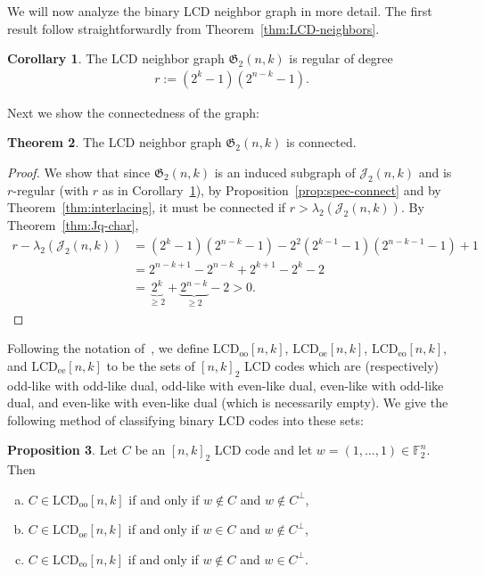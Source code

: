 \documentclass[11pt]{article}
\theoremstyle{definition}
\newtheorem{theorem}{Theorem}[section]
\newtheorem{corollary}[theorem]{Corollary}
\newtheorem{proposition}[theorem]{Proposition}
\newcommand{\F}{\mathbb{F}}
\newcommand{\LCDoo}[2]{\mathrm{LCD}_{\mathrm{oo}} [#1, #2]}
\newcommand{\LCDoe}[2]{\mathrm{LCD}_{\mathrm{oe}} [#1, #2]}
\newcommand{\LCDeo}[2]{\mathrm{LCD}_{\mathrm{eo}} [#1, #2]}
\newcommand{\LCDee}[2]{\mathrm{LCD}_{\mathrm{ee}} [#1, #2]}
\newcommand{\CurJ}{\mathcal{J}}
\newcommand{\Jq}{\CurJ}
\newcommand{\Gq}{\mathfrak{G}}
\begin{document}
We will now analyze the binary LCD neighbor graph in more detail. The first result follow straightforwardly from Theorem~\ref{thm:LCD-neighbors}.

\begin{corollary}\label{cor:regular_binary}
	The LCD neighbor graph $\Gq_2(n, k)$ is regular of degree 
	\begin{align*}
		r := (2^k-1)(2^{n-k}-1).
	\end{align*}
\end{corollary}

Next we show the connectedness of the graph:

\begin{theorem}
	The LCD neighbor graph $\Gq_2(n, k)$ is connected.
\end{theorem}

\begin{proof}
	We show that since $\Gq_2(n, k)$ is an induced subgraph of $\Jq_2(n, k)$ and is $r$-regular (with $r$ as in Corollary~\ref{cor:regular_binary}), by Proposition~\ref{prop:spec-connect} and by Theorem~\ref{thm:interlacing}, it must be connected if $r > \lambda_2(\Jq_2(n, k))$.
	By Theorem~\ref{thm:Jq-char}, 
	\begin{align*}
		r -  \lambda_2(\Jq_2(n, k))
		&= (2^k - 1)(2^{n - k } - 1) - 2^2 (2^{k - 1} - 1)(2^{n - k - 1} - 1) + 1 \\
		&= 2^{n - k + 1} - 2^{n - k} + 2^{k + 1} - 2^{k} - 2 \\
		&= \underbrace{2^{k}}_{\geq 2} + \underbrace{2^{n - k }}_{\geq 2} - 2
		> 0.
	\end{align*}
\end{proof}

Following the notation of~\cite{CMTQ18}, we define $\LCDoo{n}{k}$, $\LCDoe{n}{k}$, $\LCDeo{n}{k}$, and $\LCDee{n}{k}$ to be the sets of ${[n, k]}_2$ LCD codes which are (respectively) odd-like with odd-like dual, odd-like with even-like dual, even-like with odd-like dual, and even-like with even-like dual (which is necessarily empty).
We give the following method of classifying binary LCD codes into these sets:

\begin{proposition}\label{prop:ones}
	Let $C$ be an ${[n, k]}_2$ LCD code and let $w = (1, \ldots, 1) \in \F_2^n$.
	Then
	\begin{enumerate}[(a)]
		\item $C \in \LCDoo{n}{k}$ if and only if $w \notin C$ and $w \notin C^{\perp}$,
		\item $C \in \LCDoe{n}{k}$ if and only if $w \in C$ and $w \notin C^{\perp}$,
		\item $C \in \LCDeo{n}{k}$ if and only if $w \notin C$ and $w \in C^{\perp}$.
	\end{enumerate}
\end{proposition}
\end{document}
